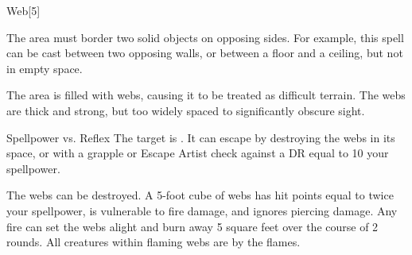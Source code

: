 \begin{spellsection}{Web}[5]
    \begin{spellheader}
    \end{spellheader}
    \begin{spellcontent}
        \begin{spelltargetinginfo}
            \spellspecial The area must border two solid objects on opposing sides. For example, this spell can be cast between two opposing walls, or between a floor and a ceiling, but not in empty space.
        \end{spelltargetinginfo}
        \begin{spelleffects}
            \spelleffect The area is filled with webs, causing it to be treated as difficult terrain. The webs are thick and strong, but too widely spaced to significantly obscure sight. %
            \spelldur \durshort \dismissable
        \end{spelleffects}
    \end{spellcontent}
    \begin{spellsubcontent}
        \begin{spelltargetinginfo}
        \end{spelltargetinginfo}
        \begin{spelleffects}
            \begin{spellattack}{Spellpower vs. Reflex}
                \spellsuccess The target is \immobilized. It can escape by destroying the webs in its space, or with a grapple or Escape Artist check against a DR equal to 10 \add your spellpower.
            \end{spellattack}
        \end{spelleffects}
    \end{spellsubcontent}
    \begin{spellfooter}
        \spellnotes The webs can be destroyed. A 5-foot cube of webs has hit points equal to twice your spellpower, is vulnerable to fire damage, and ignores piercing damage. Any fire can set the webs alight and burn away 5 square feet over the course of 2 rounds. All creatures within flaming webs are \ignited by the flames.

        \physicalspellnotes
        \miscastyou
    \end{spellfooter}
\end{spellsection}


